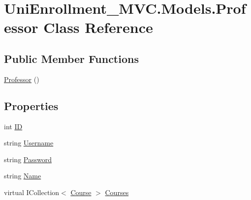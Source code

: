 \hypertarget{class_uni_enrollment___m_v_c_1_1_models_1_1_professor}{}\section{Uni\+Enrollment\+\_\+\+M\+V\+C.\+Models.\+Professor Class Reference}
\label{class_uni_enrollment___m_v_c_1_1_models_1_1_professor}
\subsection*{Public Member Functions}
\begin{DoxyCompactItemize}
\item 
\hyperlink{class_uni_enrollment___m_v_c_1_1_models_1_1_professor_a68875cd1d9f7a4b0370f9a15de523862}{Professor} ()
\end{DoxyCompactItemize}
\subsection*{Properties}
\begin{DoxyCompactItemize}
\item 
int \hyperlink{class_uni_enrollment___m_v_c_1_1_models_1_1_professor_a523e3b2481013fa4ca07e284b43b58e8}{ID}
\item 
string \hyperlink{class_uni_enrollment___m_v_c_1_1_models_1_1_professor_aad5384f0fb0a4647d5ccfdbb1a3ecc12}{Username}
\item 
string \hyperlink{class_uni_enrollment___m_v_c_1_1_models_1_1_professor_ab22587d825d96c35e5e0eb628d51f3d0}{Password}
\item 
string \hyperlink{class_uni_enrollment___m_v_c_1_1_models_1_1_professor_a35954cde0d15842398954fcfcb574def}{Name}
\item 
virtual I\+Collection$<$ \hyperlink{class_uni_enrollment___m_v_c_1_1_models_1_1_course}{Course} $>$ \hyperlink{class_uni_enrollment___m_v_c_1_1_models_1_1_professor_afa7fae847e557e25480b448ca847877c}{Courses}
\end{DoxyCompactItemize}


